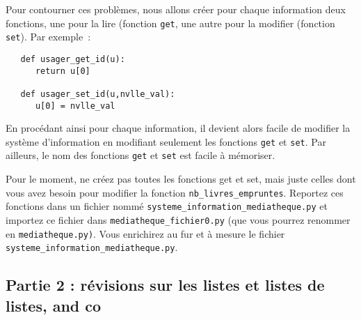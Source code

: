 \documentclass[10pt,a4paper,onecolumn]{article}
\begin{document}
Pour contourner ces problèmes, nous allons créer pour chaque information deux fonctions, une pour la lire (fonction \texttt{get}, une autre pour la modifier (fonction \texttt{set}). Par exemple~:

\begin{verbatim}
   def usager_get_id(u):
      return u[0]

   def usager_set_id(u,nvlle_val):
      u[0] = nvlle_val
\end{verbatim}

En procédant ainsi pour chaque information, il devient alors facile de modifier la système d'information en modifiant seulement les fonctions \texttt{get} et \texttt{set}. Par ailleurs, le nom des fonctions \texttt{get} et \texttt{set} est facile à mémoriser.

Pour le moment, ne créez pas toutes les fonctions get et set, mais juste celles dont vous avez besoin pour modifier la fonction \texttt{nb\_livres\_empruntes}. Reportez ces fonctions dans un fichier nommé \texttt{systeme\_information\_mediatheque.py} et importez ce fichier dans \texttt{mediatheque\_fichier0.py} (que vous pourrez renommer en \texttt{mediatheque.py)}. Vous enrichirez au fur et à mesure le fichier \texttt{systeme\_information\_mediatheque.py}.

\subsection{Partie 2 : révisions sur les listes et listes de listes, and co}
\end{document}
